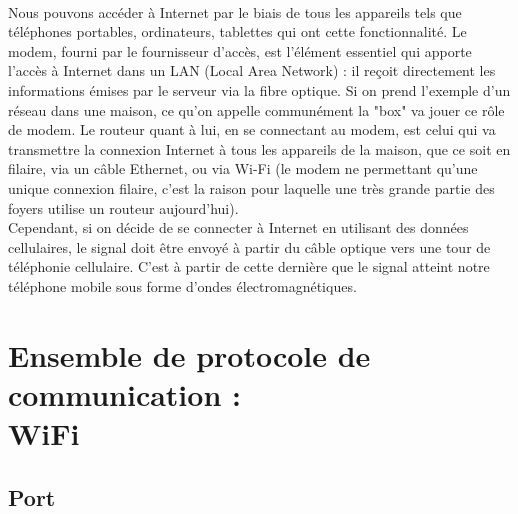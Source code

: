 \documentclass[12pt, oneside]{report}
\begin{document}
        \paragraph{}{Nous pouvons accéder à Internet par le biais de tous les appareils tels que téléphones portables, ordinateurs, tablettes qui ont cette fonctionnalité. Le modem, fourni par le fournisseur d'accès, est l'élément essentiel qui apporte l'accès à Internet dans un LAN (Local Area Network) : il reçoit directement les informations émises par le serveur via la fibre optique. Si on prend l'exemple d'un réseau dans une maison, ce qu'on appelle communément la "box" va jouer ce rôle de modem. Le routeur quant à lui, en se connectant au modem, est celui qui va transmettre la connexion Internet à tous les appareils de la maison, que ce soit en filaire, via un câble Ethernet, ou via Wi-Fi (le modem ne permettant qu'une unique connexion filaire, c'est la raison pour laquelle une très grande partie des foyers utilise un routeur aujourd'hui).\\Cependant, si on décide de se connecter à Internet en utilisant des données cellulaires, le signal doit être envoyé à partir du câble optique vers une tour de téléphonie cellulaire. C'est à partir de cette dernière que le signal atteint notre téléphone mobile sous forme d'ondes électromagnétiques.}
        \section{Ensemble de protocole de communication : \\ WiFi}
        \subsection{Port}
\end{document}
